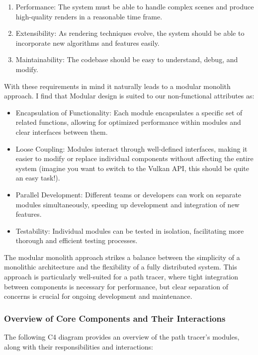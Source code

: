 \documentclass[12pt]{article}
\begin{document}
\begin{enumerate}
    \item Performance: The system must be able to handle complex scenes and produce high-quality renders in a reasonable time frame.
    \item Extensibility: As rendering techniques evolve, the system should be able to incorporate new algorithms and features easily.
    \item Maintainability: The codebase should be easy to understand, debug, and modify.
\end{enumerate}

With these requirements in mind it naturally leads to a modular monolith approach. I find that Modular design is suited to our non-functional attributes as:

\begin{itemize}
    \item Encapsulation of Functionality: Each module encapsulates a specific set of related functions, allowing for optimized performance within modules and clear interfaces between them.
    \item Loose Coupling: Modules interact through well-defined interfaces, making it easier to modify or replace individual components without affecting the entire system (imagine you want to switch to the Vulkan API, this should be quite an easy task!).
    \item Parallel Development: Different teams or developers can work on separate modules simultaneously, speeding up development and integration of new features.
    \item Testability: Individual modules can be tested in isolation, facilitating more thorough and efficient testing processes.
\end{itemize}

The modular monolith approach strikes a balance between the simplicity of a monolithic architecture and the flexibility of a fully distributed system. This approach is particularly well-suited for a path tracer, where tight integration between components is necessary for performance, but clear separation of concerns is crucial for ongoing development and maintenance.

\subsubsection{Overview of Core Components and Their Interactions}

The following C4 diagram provides an overview of the path tracer's modules, along with their responsibilities and interactions:
\end{document}
